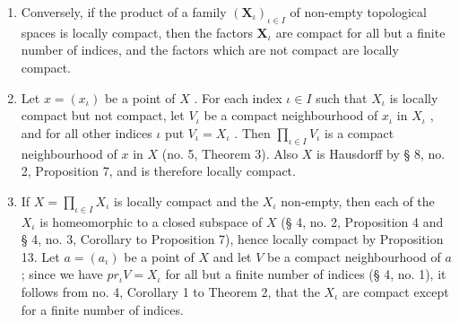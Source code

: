 \begin{enumerate}
\def\labelenumi{\alph{enumi})}
\setcounter{enumi}{1}
\item
  Conversely, if the product of a family \((\mathbf{X}_{\iota})_{\iota\in I}\) of non-empty topological spaces is locally compact, then the factors \(\mathbf{X}_{\iota}\) are compact for all but a finite number of indices, and the factors which are not compact are locally compact.
\item
  Let \(x = (x_{\iota})\) be a point of \(X\) . For each index \(\iota \in I\) such that \(X_{\iota}\) is locally compact but not compact, let \(V_{\iota}\) be a compact neighbourhood of \(x_{\iota}\) in \(X_{\iota}\) , and for all other indices \(\iota\) put \(V_{\iota} = X_{\iota}\) . Then \(\prod_{\iota \in I} V_{\iota}\) is a compact neighbourhood of \(x\) in \(X\) (no. 5, Theorem 3). Also \(X\) is Hausdorff by § 8, no. 2, Proposition 7, and is therefore locally compact.
\item
  If \(X = \prod_{\iota \in I} X_{\iota}\) is locally compact and the \(X_{\iota}\) non-empty, then each of the \(X_{\iota}\) is homeomorphic to a closed subspace of \(X\) (§ 4, no. 2, Proposition 4 and § 4, no. 3, Corollary to Proposition 7), hence locally compact by Proposition 13. Let \(a = (a_{\iota})\) be a point of \(X\) and let \(V\) be a compact neighbourhood of \(a\) ; since we have \(pr_{\iota}V = X_{\iota}\) for all but a finite number of indices (§ 4, no. 1), it follows from no. 4, Corollary 1 to Theorem 2, that the \(X_{\iota}\) are compact except for a finite number of indices.
\end{enumerate}

